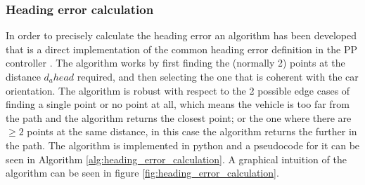 \documentclass[a4paper,12pt,sort&compress]{article}
\begin{document}

\subsubsection*{Heading error calculation}
    In order to precisely calculate the heading error an algorithm has been developed that is a
    direct implementation of the common heading error definition in the PP controller
    \citep*{9368694}. The algorithm works by first finding the (normally 2) points at the distance
    $d_ahead$ required, and then selecting the one that is coherent with the car orientation. The
    algorithm is robust with respect to the 2 possible edge cases of finding a single point or no
    point at all, which means the vehicle is too far from the path and the algorithm returns the
    closest point; or the one where there are $\geq 2$ points at the same distance, in this case the
    algorithm returns the further in the path. The algorithm is implemented in python and a
    pseudocode for it can be seen in Algorithm \ref*{alg:heading_error_calculation}. A graphical
    intuition of the algorithm can be seen in figure \ref*{fig:heading_error_calculation}. 
    
\end{document}
